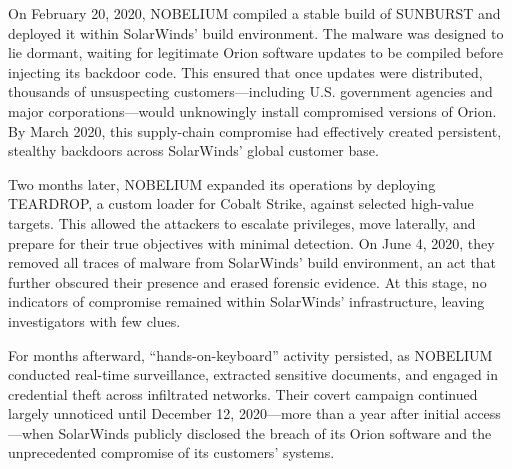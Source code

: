 \documentclass[conference]{IEEEtran}
\begin{document}
On February 20, 2020, NOBELIUM compiled a stable build of SUNBURST and deployed it within SolarWinds’ build environment. The malware was 
designed to lie dormant, waiting for legitimate Orion software updates to be compiled before injecting its backdoor code. This ensured that 
once updates were distributed, thousands of unsuspecting customers—including U.S. government agencies and major corporations—would unknowingly 
install compromised versions of Orion. By March 2020, this supply-chain compromise had effectively created persistent, stealthy backdoors across 
SolarWinds’ global customer base.\cite{MicrosoftDeepDiveSOLORIGATE}

Two months later, NOBELIUM expanded its operations by deploying TEARDROP, a custom loader for Cobalt Strike, against selected high-value targets.
 This allowed the attackers to escalate privileges, move laterally, and prepare for their true objectives with minimal detection. On June 4, 2020, 
 they removed all traces of malware from SolarWinds’ build environment, an act that further obscured their presence and erased forensic evidence.
  At this stage, no indicators of compromise remained within SolarWinds’ infrastructure, leaving investigators with few clues.\cite{MicrosoftDeepDiveSOLORIGATE}

For months afterward, “hands-on-keyboard” activity persisted, as NOBELIUM conducted real-time surveillance, extracted sensitive documents, and engaged 
in credential theft across infiltrated networks. Their covert campaign continued largely unnoticed until December 12, 2020—more than a year after initial 
access—when SolarWinds publicly disclosed the breach of its Orion software and the unprecedented compromise of its customers’ systems.\cite{MicrosoftDeepDiveSOLORIGATE}
\end{document}
